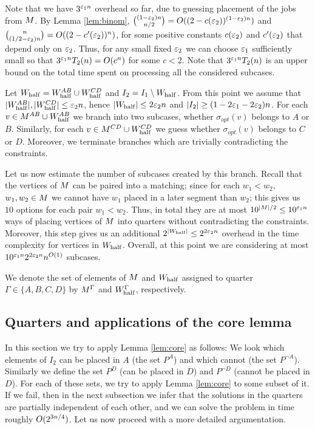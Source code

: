 \documentclass{article}
\theoremstyle{definition}
\begin{document}
Note that we have $3^{\varepsilon_1 n}$ overhead so far, due to guessing placement of the jobs from $M$.
By Lemma \ref{lem:binom}, $\binom{(1-\varepsilon_2) n}{n/2} = O((2-c(\varepsilon_2))^{(1-\varepsilon_2) n})$ and $\binom{n}{(1/2 - \varepsilon_2)n} = O((2-c'(\varepsilon_2))^n)$,
for some positive constants $c(\varepsilon_2)$ and $c'(\varepsilon_2)$ that depend only on $\varepsilon_2$.
Thus, for any small fixed $\varepsilon_2$ we can choose $\varepsilon_1$ sufficiently small
so that $3^{\varepsilon_1 n} T_2(n) = O(c^n)$ for some $c < 2$. Note that $3^{\varepsilon_1 n} T_2(n)$ is an upper bound on the total time spent on processing all the considered subcases.

Let $W_{\mathrm{half}} = W_{\mathrm{half}}^{AB} \cup W_{\mathrm{half}}^{CD}$ and $I_2 = I_1 \setminus W_{\mathrm{half}}$. From this point we assume that $|W_{\mathrm{half}}^{AB}|, |W_{\mathrm{half}}^{CD}| \leq \varepsilon_2 n$, hence $|W_{\mathrm{half}}| \leq 2\varepsilon_2 n$
and $|I_2| \geq (1-2\varepsilon_1-2\varepsilon_2)n$.
For each $v \in M^{AB} \cup W_{\mathrm{half}}^{AB}$ we branch into two subcases, whether $\sigma_{opt}(v)$ belongs to $A$ or $B$. Similarly, for each $v \in M^{CD} \cup W_{\mathrm{half}}^{CD}$
we guess whether $\sigma_{opt}(v)$
belongs to $C$ or $D$. Moreover, we terminate branches which are trivially contradicting the constraints.

Let us now estimate the number of subcases created by this branch.
Recall that the vertices of $M$ can be paired into a matching; since for each $w_1 < w_2$, $w_1,w_2 \in M$ we cannot have $w_1$ placed in a later segment than $w_2$;
this gives us $10$ options for each pair $w_1 < w_2$.
Thus, in total they are at most $10^{|M|/2} \leq 10^{\varepsilon_1 n}$ ways of placing vertices of $M$ into quarters without contradicting the constraints.
Moreover, this step gives us an additional $2^{|W_{\mathrm{half}}|} \leq 2^{2\varepsilon_2 n}$ overhead in the time complexity for vertices in $W_{\mathrm{half}}$.
Overall, at this point we are considering at most $10^{\varepsilon_1 n} 2^{2\varepsilon_2 n} n^{O(1)}$ subcases.

We denote the set of elements of $M$ and $W_{\mathrm{half}}$ assigned to quarter $\Gamma \in \{A,B,C,D\}$ by $M^\Gamma$ and $W_{\mathrm{half}}^\Gamma$, respectively.

\subsection{Quarters and applications of the core lemma}\label{sec:appl-core}

In this section we try to apply Lemma \ref{lem:core} as follows:
We look which elements of $I_2$ can be placed in $A$ (the set $P^A$) and which cannot (the set $P^{\neg A}$).
Similarly we define the set $P^D$ (can be placed in $D$) and $P^{\neg D}$ (cannot be placed in $D$).
For each of these sets, we try to apply Lemma \ref{lem:core} to some subset of it.
If we fail, then in the next subsection we infer that the solutions in the quarters are partially independent of
each other, and we can solve the problem in time roughly $O(2^{3n/4})$.
Let us now proceed with a more detailed argumentation.
\end{document}
